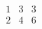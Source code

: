 \documentclass{acm_proc_article-sp}
\begin{document}
\[\begin{matrix}
		1&3&3\\
		2&4&6
	\end{matrix}\]
\end{document}
